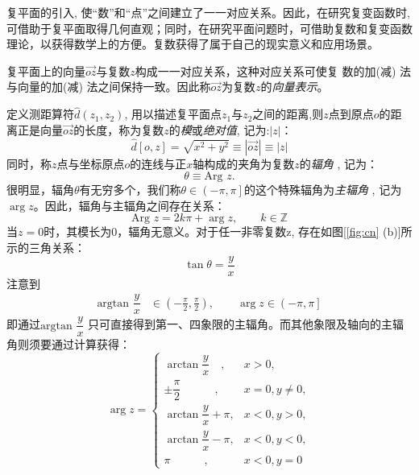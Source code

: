 复平面的引入, 使“数”和“点”之间建立了一一对应关系。因此，在研究复变函数时, 可借助于复平面取得几何直观；同时，在研究平面问题时，可借助复数和复变函数理论，以获得数学上的方便。复数获得了属于自己的现实意义和应用场景。

复平面上的向量$\overrightarrow{oz}$与复数$z$构成一一对应关系，这种对应关系可使复
数的加(减) 法与向量的加(减) 法之间保持一致。因此称$\overrightarrow{oz}$为复数$z$的\emph{向量表示}。

定义测距算符$\hat{d}(z_1, z_2)$, 用以描述复平面点$z_1$与$z_2$之间的距离,则$z$点到原点$o$的距离正是向量$\overrightarrow{oz}$的长度，称为复数$z$的\emph{模}或\emph{绝对值}, 记为:$\left\vert z\right\vert$：
\begin{equation}\label{}
    \hat{d}[o,z] = \sqrt{ x^2 + y^2} \equiv \left\vert \overrightarrow{oz} \right\vert \equiv \left\vert z \right\vert
\end{equation} 
同时，称$z$点与坐标原点$o$的连线与正$x$轴构成的夹角为复数$z$的\emph{辐角 }, 记为：
\begin{equation}
    \theta  \equiv \text{Arg } z.
\end{equation}
很明显，辐角$ \theta $有无穷多个，我们称$ \theta \in \left(-\pi, \pi \right]$的这个特殊辐角为\emph{主辐角 }, 记为 $\arg z$。因此，辐角与主辐角之间存在关系：
\begin{equation}\label{}
    \text{Arg } z = 2 k \pi + \arg z, \qquad k \in \mathbb{Z} 
\end{equation}
当$z=0$时，其模长为0，辐角无意义。对于任一非零复数z, 存在如图[\ref{fig:cn} (b)]所示的三角关系： 
\begin{equation}\label{}
    \tan \theta = \frac{y}{x}  
\end{equation}
注意到
\[ \begin{aligned}
\text{argtan }\dfrac{y}{x} & \in (- \frac{\pi}{2 }, \frac{\pi}{2 }), \qquad 
\arg z \in \left( - \pi, \pi \right] 
\end{aligned}\]
即通过$\text{argtan } \dfrac{y}{x}$ 只可直接得到第一、四象限的主辐角。而其他象限及轴向的主辐角则须要通过计算获得：
\begin{equation}
    \arg z=\left\{\begin{array}{cc}
        \arctan \dfrac{y}{x} \hspace{1em}, & x>0, \\ [5 pt]
        \pm \dfrac{\pi}{2} \hspace{3em}, & x=0, y \neq 0, \\[5 pt]
        \arctan \dfrac{y}{x} + \pi, & x<0, y > 0, \\[5 pt]
        \arctan \dfrac{y}{x} - \pi, & x<0, y < 0, \\[5 pt]
        \pi \hspace{3em}, & x<0, y=0 
        \end{array}\right.   
\end{equation}
